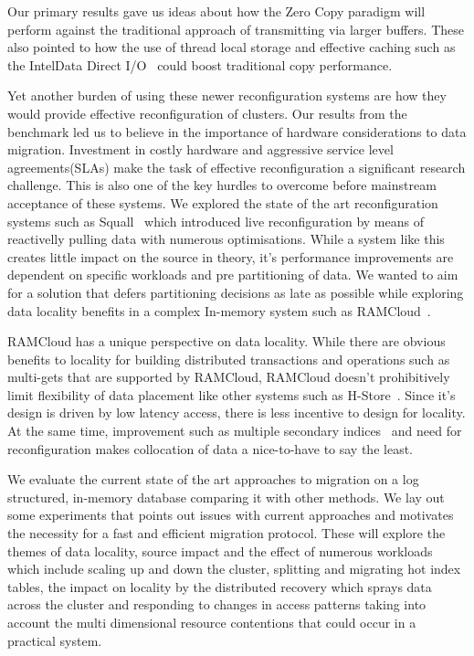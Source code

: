 Our primary results gave us ideas about how the Zero Copy paradigm will perform against
the traditional approach of transmitting via larger buffers. These also pointed to how the use of thread local storage and effective caching
such as the Intel\textregistered Data Direct I/O~\cite{ddio} could boost traditional copy performance. 

Yet another burden of using these newer reconfiguration systems are how they would provide effective 
reconfiguration of clusters. Our results from the benchmark led us to believe in the importance of 
hardware considerations to data migration. Investment in costly hardware and aggressive
service level agreements(SLAs) make the task of effective reconfiguration a significant research challenge. 
This is also one of the key hurdles to overcome before mainstream acceptance of these systems.
We explored the state of the art reconfiguration systems such as Squall~\cite{squall} which 
introduced live reconfiguration by means of reactivelly pulling data with numerous optimisations.
While a system like this creates little impact on the source in theory, it's performance improvements
are dependent on specific workloads and pre partitioning of data. We wanted to aim for a solution that defers 
partitioning decisions as late as possible while exploring data locality benefits in a complex
In-memory system such as RAMCloud~\cite{ramcloud}.


RAMCloud has a unique perspective on data locality. While there are obvious benefits to locality
for building distributed transactions and operations such as multi-gets that are supported by 
RAMCloud, RAMCloud doesn't prohibitively limit flexibility of data placement like other systems 
such as H-Store~\cite{hstore}. Since it's design is driven by low latency access, there is less incentive
to design for locality. At the same time, improvement such as multiple secondary indices~\cite{slik} and need for reconfiguration 
makes collocation of data a nice-to-have to say the least. 

We evaluate the current state of the art approaches to migration on a log structured,
in-memory database comparing it with other methods. We lay out some experiments
that points out issues with current approaches and motivates the necessity 
for a fast and efficient migration protocol. These will explore the themes of data locality,
source impact and the effect of numerous workloads which include scaling up and down the cluster, splitting
and migrating hot index tables, the impact on locality by the distributed recovery which sprays data across the 
cluster and responding to changes in access patterns taking into account the multi dimensional resource contentions
that could occur in a practical system.

